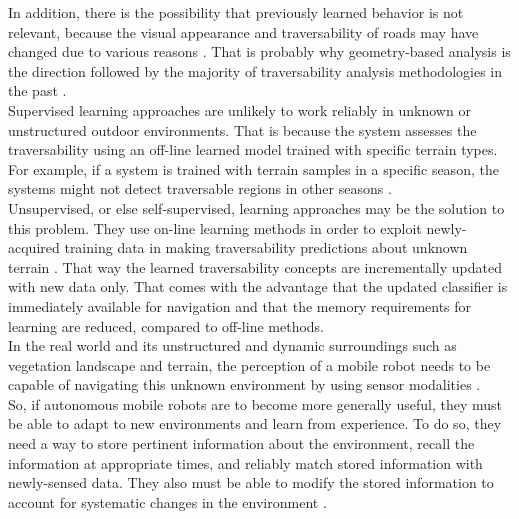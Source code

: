 \documentclass[12pt,a4paper,table,dvipsnames,tikz]{report}
\begin{document}
	In addition, there is the possibility that previously learned behavior is not 
	relevant, because the visual appearance and traversability of roads may 
	have changed due to various reasons \citep{Wigness}. That is probably why 
	geometry-based analysis is the direction followed by the majority of 
	traversability analysis methodologies in the past \citep{Papadakis}.
	\\
	
	Supervised learning approaches are unlikely to work reliably in unknown or 
	unstructured outdoor environments. That is because the system assesses the 
	traversability using an off-line learned model trained with specific 
	terrain types. For example, if a system is trained with terrain samples in a 
	specific season, the systems might not detect traversable regions in other 
	seasons \citep{Lee}.
	\\
	
	Unsupervised, or else self-supervised, learning approaches may be the solution 
	to this problem. They use on-line learning methods in order to exploit newly-
	acquired training data in making traversability predictions about unknown 
	terrain \citep{Kim}. That way the learned traversability concepts are 
	incrementally updated with new data only. That comes with the advantage that the 
	updated classifier is immediately available for navigation and that the memory 
	requirements for learning are reduced, compared to off-line methods.
	\\
	
	In the real world and its unstructured and dynamic surroundings such as vegetation 
	landscape and terrain, the perception of a mobile robot needs to be capable of 
	navigating this unknown environment by using sensor modalities \citep{Shabbir}.
	\\
	
	So, if autonomous mobile robots are to become more generally useful, they must 
	be able to adapt to new environments and learn from experience. To do so, they 
	need a way to store pertinent information about the environment, recall the 
	information at appropriate times, and reliably match stored information with 
	newly-sensed data. They also must be able to modify the stored information to 
	account for systematic changes in the environment \citep{Shneier}.
	\\
	
\end{document}
